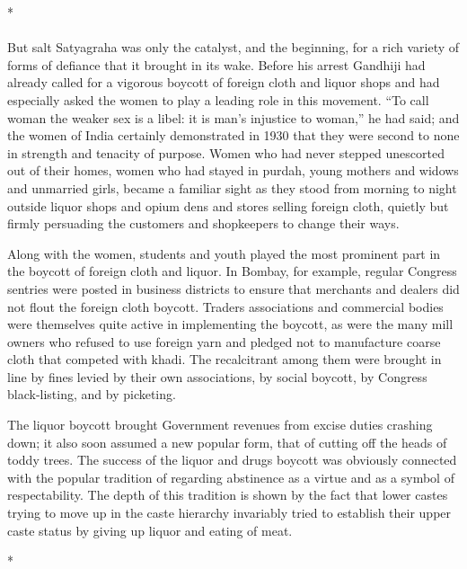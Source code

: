 \begin{multicols}{2}
\begin{center}*\end{center}

\paragraph*{}
But salt Satyagraha was only the catalyst, and the beginning, for a rich variety of forms of defiance that it brought in its wake. Before his arrest Gandhiji had already called for a vigorous boycott of foreign cloth and liquor shops and had especially asked the women to play a leading role in this movement. ``To call woman the weaker sex is a libel: it is man's injustice to woman,'' he had said; and the women of India certainly demonstrated in 1930 that they were second to none in strength and tenacity of purpose. Women who had never stepped unescorted out of their homes, women who had stayed in purdah, young mothers and widows and unmarried girls, became a familiar sight as they stood from morning to night outside liquor shops and opium dens and stores selling foreign cloth, quietly but firmly persuading the customers and shopkeepers to change their ways.

Along with the women, students and youth played the most prominent part in the boycott of foreign cloth and liquor. In Bombay, for example, regular Congress sentries were posted in business districts to ensure that merchants and dealers did not flout the foreign cloth boycott. Traders associations and commercial bodies were themselves quite active in implementing the boycott, as were the many mill owners who refused to use foreign yarn and pledged not to manufacture coarse cloth that competed with khadi. The recalcitrant among them were brought in line by fines levied by their own associations, by social boycott, by Congress black-listing, and by picketing.

The liquor boycott brought Government revenues from excise duties crashing down; it also soon assumed a new popular form, that of cutting off the heads of toddy trees. The success of the liquor and drugs boycott was obviously connected with the popular tradition of regarding abstinence as a virtue and as a symbol of respectability. The depth of this tradition is shown by the fact that lower castes trying to move up in the caste hierarchy invariably tried to establish their upper caste status by giving up liquor and eating of meat.

\begin{center}*\end{center}


\end{multicols}
